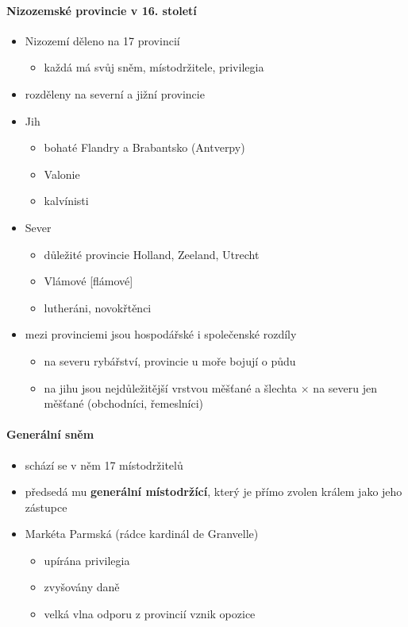 \paragraph{Nizozemské provincie v 16. století}
\begin{itemize}
\item Nizozemí děleno na 17 provincií
	\begin{itemize}
	\item každá má svůj sněm, místodržitele, privilegia
	\end{itemize}
\item rozděleny na severní a jižní provincie
\item Jih
 	\begin{itemize}
	\item bohaté Flandry a Brabantsko (Antverpy)
	\item Valonie
	\item kalvínisti
 	\end{itemize}
\item Sever
	\begin{itemize}
	\item důležité provincie Holland, Zeeland, Utrecht
	\item Vlámové [flámové]
	\item lutheráni, novokřtěnci
	\end{itemize}
\item mezi provinciemi jsou hospodářské i společenské rozdíly
	\begin{itemize}
	\item na severu rybářství, provincie u moře bojují o půdu
	\item na jihu jsou nejdůležitější vrstvou měšťané a šlechta $\times$ na severu jen měšťané (obchodníci, řemeslníci)
	\end{itemize}
\end{itemize}

\paragraph{Generální sněm}
\begin{itemize}
\item schází se v něm 17 místodržitelů
\item předsedá mu \textbf{generální místodržící}, který je přímo zvolen králem jako jeho zástupce
\item Markéta Parmská (rádce kardinál de Granvelle)
	\begin{itemize}
	\item upírána privilegia
	\item zvyšovány daně
	\item velká vlna odporu z provincií \ra vznik opozice
	\end{itemize}
\end{itemize}

